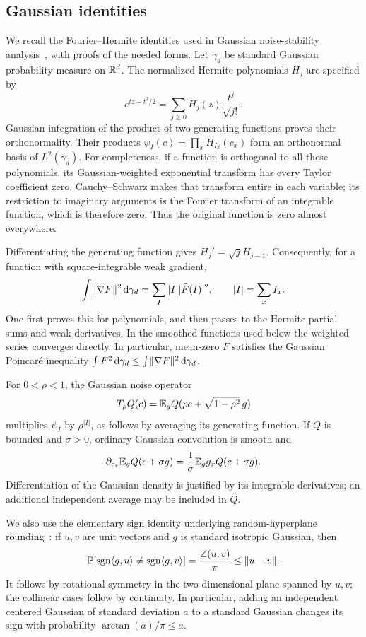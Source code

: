 \subsection{Gaussian identities}

We recall the Fourier--Hermite identities used in Gaussian
noise-stability analysis~\cite[Sections~4.1 and~5]{MOO10}, with proofs of the needed forms.
Let $\gamma_d$ be standard Gaussian probability measure on $\mathbb R^d$. The normalized
Hermite polynomials $H_j$ are specified by
\[
 e^{tz-t^2/2}=\sum_{j\ge0}H_j(z)\frac{t^j}{\sqrt{j!}}.
\]
Gaussian integration of the product of two generating functions proves their
orthonormality. Their products
$\psi_I(c)=\prod_x H_{I_x}(c_x)$ form an orthonormal basis of
$L^2(\gamma_d)$. For completeness, if a function is orthogonal to all these
polynomials, its Gaussian-weighted exponential transform has every Taylor
coefficient zero. Cauchy--Schwarz makes that transform entire in each variable;
its restriction to imaginary arguments is the Fourier transform of an
integrable function, which is therefore zero. Thus the original function is
zero almost everywhere.

Differentiating the generating function gives
$H_j'=\sqrt j H_{j-1}$. Consequently, for a function with square-integrable
weak gradient,
\begin{equation}\label{eq:hermite-energy}
 \int\lVert\nabla F\rVert^2\,\mathrm d\gamma_d
 =\sum_I |I|\lvert\widehat F(I)\rvert^2,
 \qquad |I|=\sum_x I_x.
\end{equation}
One first proves this for polynomials, and then passes to the Hermite partial
sums and weak derivatives. In the smoothed functions used below the weighted
series converges directly. In particular, mean-zero $F$ satisfies the Gaussian
Poincar\'e inequality $\int F^2\,\mathrm d\gamma_d\le\int\lVert\nabla F\rVert^2\,\mathrm d\gamma_d$.

For $0<\rho<1$, the Gaussian noise operator
\[
 T_\rho Q(c)=\mathbb E_g Q(\rho c+\sqrt{1-\rho^2}\,g)
\]
multiplies $\psi_I$ by $\rho^{|I|}$, as follows by averaging its generating
function. If $Q$ is bounded and $\sigma>0$, ordinary Gaussian convolution is
smooth and
\begin{equation}\label{eq:gaussian-derivative}
 \partial_{c_x}\mathbb E_g Q(c+\sigma g)
 =\frac1\sigma\mathbb E_g g_xQ(c+\sigma g).
\end{equation}
Differentiation of the Gaussian density is justified by its integrable
derivatives; an additional independent average may be included in $Q$.

We also use the elementary sign identity underlying random-hyperplane
rounding~\cite[Lemma~3.2]{GW95}: if $u,v$ are unit vectors and $g$ is
standard isotropic Gaussian, then
\begin{equation}\label{eq:gaussian-signs}
 \mathbb P[\operatorname{sgn}\langle g,u\rangle\ne\operatorname{sgn}\langle g,v\rangle]
 =\frac{\angle(u,v)}\pi\le\lVert u-v\rVert.
\end{equation}
It follows by rotational symmetry in the two-dimensional plane spanned by
$u,v$; the collinear cases follow by continuity. In particular, adding an
independent centered Gaussian of standard deviation $a$ to a standard Gaussian changes
its sign with probability $\arctan(a)/\pi\le a$.

